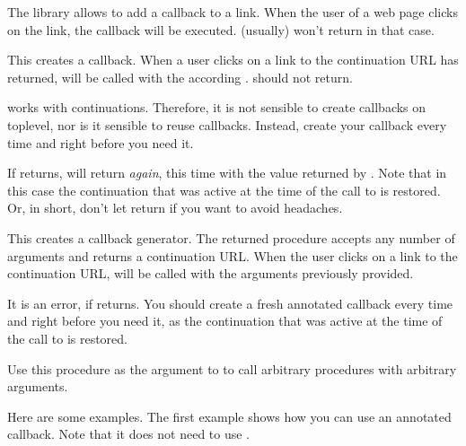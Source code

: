 The \surflets library allows to add a callback to a link.  When the
  user of a web page clicks on the link, the callback will be
  executed.  (usually) won't return in that
  case.


\begin{desc}
  This creates a callback.  When a user clicks on a link to the
  continuation URL  has returned,
   will be called with the according
  .   should not return.

   works with continuations.  Therefore, it is not
  sensible to create callbacks on toplevel, nor is it sensible to
  reuse callbacks.  Instead, create your callback every time and right
  before you need it.

  If  returns,  will return
  \emph{again}, this time with the value returned by
  .  Note that in this case the continuation
  that was active at the time of the call to  is
  restored.  Or, in short, don't let  return
  if you want to avoid headaches.
\end{desc}

\begin{desc}
  This creates a callback generator.  The returned procedure accepts
  any number of arguments  and returns a continuation URL.
  When the user clicks on a link to the continuation URL,
   will be called with the arguments
   previously provided.  

  It is an error, if  returns.  You should
  create a fresh annotated callback every time and right before you
  need it, as the continuation that was active at the time of the call
  to  is restored.
\end{desc}

\begin{desc}
  Use this procedure as the  argument to
   to call arbitrary procedures with
  arbitrary arguments.
\end{desc}

Here are some examples.  The first example shows how you can use an
  annotated callback.  Note that it does not need to use
  .

